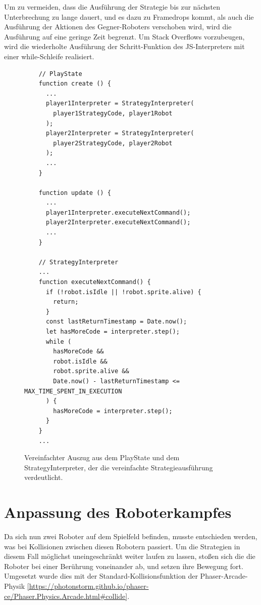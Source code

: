 Um zu vermeiden, dass die Ausführung der Strategie bis zur nächsten Unterbrechung zu lange dauert,
und es dazu zu Framedrops kommt, als auch die Ausführung der Aktionen des Gegner-Roboters verschoben
wird, wird die Ausführung auf eine geringe Zeit begrenzt. Um Stack Overflows vorzubeugen, wird die
wiederholte Ausführung der Schritt-Funktion des JS-Interpreters mit einer while-Schleife realisiert.


\begin{figure}
  \caption{Vereinfachter Auszug aus dem PlayState und dem StrategyInterpreter, der die vereinfachte
  Strategieausführung verdeutlicht.}

  \label{strategy-interpreter-new}

  \begin{lstlisting}
    // PlayState
    function create () {
      ...
      player1Interpreter = StrategyInterpreter(
        player1StrategyCode, player1Robot
      );
      player2Interpreter = StrategyInterpreter(
        player2StrategyCode, player2Robot
      );
      ...
    }

    function update () {
      ...
      player1Interpreter.executeNextCommand();
      player2Interpreter.executeNextCommand();
      ...
    }

    // StrategyInterpreter
    ...
    function executeNextCommand() {
      if (!robot.isIdle || !robot.sprite.alive) {
        return;
      }
      const lastReturnTimestamp = Date.now();
      let hasMoreCode = interpreter.step();
      while (
        hasMoreCode &&
        robot.isIdle &&
        robot.sprite.alive &&
        Date.now() - lastReturnTimestamp <= MAX_TIME_SPENT_IN_EXECUTION
      ) {
        hasMoreCode = interpreter.step();
      }
    }
    ...
  \end{lstlisting}
\end{figure}


\section{Anpassung des Roboterkampfes}

Da sich nun zwei Roboter auf dem Spielfeld befinden, musste entschieden werden, was bei Kollisionen
zwischen diesen Robotern passiert. Um die Strategien in diesem Fall möglichst uneingeschränkt weiter
laufen zu lassen, stoßen sich die die Roboter bei einer Berührung voneinander ab, und setzen ihre
Bewegung fort. Umgesetzt wurde dies mit der Standard-Kollisionsfunktion der Phaser-Arcade-Physik
\ref{https://photonstorm.github.io/phaser-ce/Phaser.Physics.Arcade.html#collide}.

